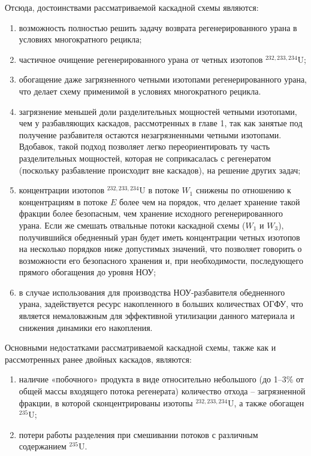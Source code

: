 Отсюда, достоинствами рассматриваемой каскадной схемы являются:

\begin{enumerate}
    \item возможность полностью решить задачу возврата регенерированного урана в условиях многократного рецикла;
    \item частичное очищение регенерированного урана от четных изотопов $^{232,233,234}$U;
    \item обогащение даже загрязненного четными изотопами регенерированного урана, что делает схему применимой в условиях многократного рецикла.
    \item загрязнение меньшей доли разделительных мощностей четными изотопами, чем у разбавляющих каскадов, рассмотренных в главе 1, так как занятые под получение разбавителя остаются незагрязненными четными изотопами. Вдобавок, такой подход позволяет легко переориентировать ту часть разделительных мощностей, которая не соприкасалась с регенератом (поскольку разбавление происходит вне каскадов), на решение других задач;
    \item концентрации изотопов $^{232,233,234}$U в потоке $W_1$ снижены по отношению к концентрациям в потоке $E$ более чем на порядок, что делает хранение такой фракции более безопасным, чем хранение исходного регенерированного урана. Если же смешать отвальные потоки каскадной схемы ($W_1$  и $W_3$), получившийся обедненный уран будет иметь концентрации четных изотопов на несколько порядков ниже допустимых значений, что позволяет говорить о возможности его безопасного хранения и, при необходимости, последующего прямого обогащения до уровня НОУ;
    \item в случае использования для производства НОУ-разбавителя обедненного урана, задействуется ресурс накопленного в больших количествах ОГФУ, что является немаловажным для эффективной утилизации данного материала и снижения динамики его накопления.
\end{enumerate}

Основными недостатками рассматриваемой каскадной схемы, также как и рассмотренных ранее двойных каскадов, являются: 
\begin{enumerate}
    \item наличие «побочного» продукта в виде относительно небольшого (до 1–3\% от общей массы входящего потока регенерата) количество отхода -- загрязненной фракции, в которой сконцентрированы изотопы $^{232,233,234}$U, а также обогащен $^{235}$U;
    \item потери работы разделения при смешивании потоков с различным содержанием  $^{235}$U.
\end{enumerate}


